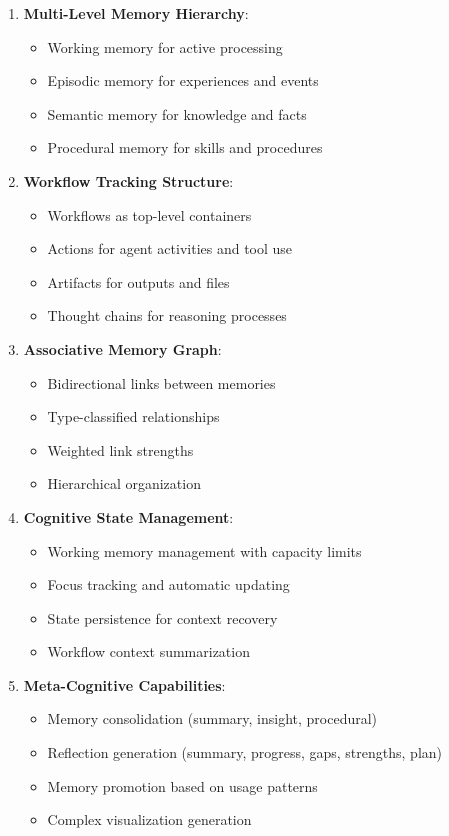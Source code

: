 \documentclass[12pt,a4paper]{article}
\begin{document}
\begin{enumerate}[label=\arabic*.]
    \item \textbf{Multi-Level Memory Hierarchy}:
    \begin{itemize}
        \item Working memory for active processing
        \item Episodic memory for experiences and events
        \item Semantic memory for knowledge and facts
        \item Procedural memory for skills and procedures
    \end{itemize}

    \item \textbf{Workflow Tracking Structure}:
    \begin{itemize}
        \item Workflows as top-level containers
        \item Actions for agent activities and tool use
        \item Artifacts for outputs and files
        \item Thought chains for reasoning processes
    \end{itemize}

    \item \textbf{Associative Memory Graph}:
    \begin{itemize}
        \item Bidirectional links between memories
        \item Type-classified relationships
        \item Weighted link strengths
        \item Hierarchical organization
    \end{itemize}

    \item \textbf{Cognitive State Management}:
    \begin{itemize}
        \item Working memory management with capacity limits
        \item Focus tracking and automatic updating
        \item State persistence for context recovery
        \item Workflow context summarization
    \end{itemize}

    \item \textbf{Meta-Cognitive Capabilities}:
    \begin{itemize}
        \item Memory consolidation (summary, insight, procedural)
        \item Reflection generation (summary, progress, gaps, strengths, plan)
        \item Memory promotion based on usage patterns
        \item Complex visualization generation
    \end{itemize}


\end{enumerate}
\end{document}
